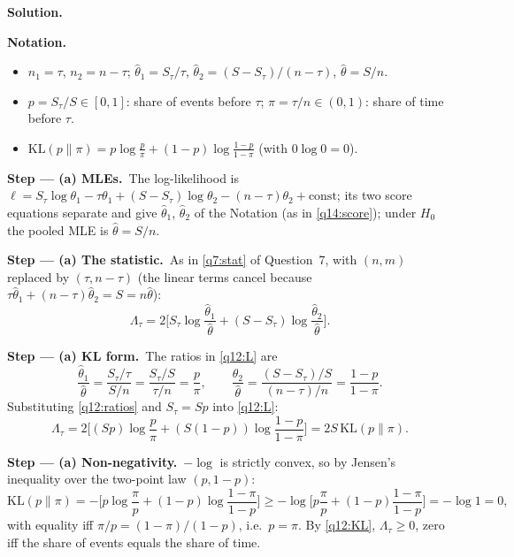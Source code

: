 \documentclass[11pt,a4paper]{article}
\numberwithin{equation}{questao}   %
\newenvironment{notacao}{\par\smallskip\noindent\textbf{Notation.}\begin{itemize}[leftmargin=1.4em,topsep=1pt,itemsep=0pt]\small}{\end{itemize}}
\newcommand{\passo}[2]{\par\smallskip\noindent\textbf{Step --- #1.}~#2}
\newcommand{\solhead}{\par\medskip\noindent{\color{blue!55!black}\rule{\linewidth}{0.3pt}}\par\noindent\textbf{Solution.}}
\newcommand{\1}{\mathbf{1}}
\begin{document}
\begin{sol}
\solhead
\begin{notacao}
\item $n_1=\tau$, $n_2=n-\tau$; $\hat\theta_1=S_\tau/\tau$, $\hat\theta_2=(S-S_\tau)/(n-\tau)$, $\hat\theta=S/n$.
\item $p=S_\tau/S\in[0,1]$: share of events before $\tau$; $\pi=\tau/n\in(0,1)$: share of time before $\tau$.
\item $\mathrm{KL}(p\|\pi)=p\log\frac p\pi+(1-p)\log\frac{1-p}{1-\pi}$ (with $0\log0=0$).
\end{notacao}

\passo{(a) MLEs}{The log-likelihood is
$\ell=S_\tau\log\theta_1-\tau\theta_1+(S-S_\tau)\log\theta_2-(n-\tau)\theta_2+\text{const}$; its two
score equations separate and give $\hat\theta_1$, $\hat\theta_2$ of the Notation (as in
\eqref{q14:score}); under $H_0$ the pooled MLE is $\hat\theta=S/n$.}

\passo{(a) The statistic}{As in \eqref{q7:stat} of Question~7, with $(n,m)$ replaced by
$(\tau,n-\tau)$ (the linear terms cancel because $\tau\hat\theta_1+(n-\tau)\hat\theta_2=S=n\hat\theta$):}
\begin{equation}\label{q12:L}
\Lambda_\tau=2\Big[S_\tau\log\frac{\hat\theta_1}{\hat\theta}+(S-S_\tau)\log\frac{\hat\theta_2}{\hat\theta}\Big].
\end{equation}

\passo{(a) KL form}{The ratios in \eqref{q12:L} are}
\begin{equation}\label{q12:ratios}
\frac{\hat\theta_1}{\hat\theta}=\frac{S_\tau/\tau}{S/n}=\frac{S_\tau/S}{\tau/n}=\frac p\pi,\qquad
\frac{\hat\theta_2}{\hat\theta}=\frac{(S-S_\tau)/S}{(n-\tau)/n}=\frac{1-p}{1-\pi}.
\end{equation}
Substituting \eqref{q12:ratios} and $S_\tau=Sp$ into \eqref{q12:L}:
\begin{equation}\label{q12:KL}
\Lambda_\tau=2\Big[(Sp)\log\frac p\pi+(S(1-p))\log\frac{1-p}{1-\pi}\Big]=2S\,\mathrm{KL}(p\|\pi).
\end{equation}

\passo{(a) Non-negativity}{$-\log$ is strictly convex, so by Jensen's inequality over the two-point
law $(p,1-p)$:}
\[
\mathrm{KL}(p\|\pi)=-\Big[p\log\frac\pi p+(1-p)\log\frac{1-\pi}{1-p}\Big]\ge-\log\Big[p\frac\pi p+(1-p)\frac{1-\pi}{1-p}\Big]=-\log1=0,
\]
with equality iff $\pi/p=(1-\pi)/(1-p)$, i.e.\ $p=\pi$. By \eqref{q12:KL}, $\Lambda_\tau\ge0$, zero iff
the share of events equals the share of time.


\end{sol}
\end{document}
